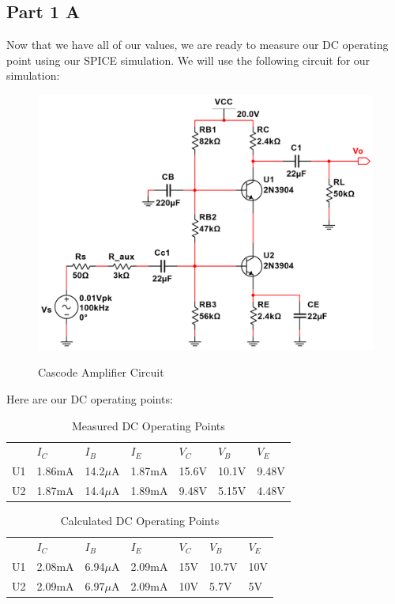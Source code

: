 \documentclass[12pt]{article}
\begin{document}

\subsection{Part 1 A}

Now that we have all of our values, we are  ready to measure our DC operating point using our SPICE simulation. We will use the following circuit for our simulation:

\begin{figure}[h!]
\centering
\includegraphics[height=0.30\textwidth]{Images/part_1_circuit_sim.png}\\
\caption{Cascode Amplifier Circuit}
\label{fig:part1_circuit_sim}
\end{figure}

 Here are our DC operating points:

\begin{table}[h!]
\centering
\begin{tabular}{l|llllll}
   & $I_{C}$ & $I_{B}$    & $I_{E}$ & $V_C$ & $V_B$ & $V_{E}$ \\ \cline{1-7}
U1 & 1.86mA  & 14.2$\mu$A & 1.87mA  & 15.6V  & 10.1V   & 9.48V    \\
U2 & 1.87mA  & 14.4$\mu$A & 1.89mA  & 9.48V  & 5.15V   & 4.48V   
\end{tabular}
\caption{Measured DC Operating Points}
\label{DC_op_point}
\end{table}
\FloatBarrier
\begin{table}[h!]
\centering
\begin{tabular}{l|llllll}
   & $I_{C}$ & $I_{B}$    & $I_{E}$ & $V_C$ & $V_B$ & $V_{E}$ \\ \cline{1-7}
U1 & 2.08mA  & 6.94$\mu$A & 2.09mA  & 15V  & 10.7V   & 10V    \\
U2 & 2.09mA  & 6.97$\mu$A & 2.09mA  & 10V  & 5.7V   & 5V   
\end{tabular}
\caption{Calculated DC Operating Points}
\label{DC_op_point}
\end{table}
\FloatBarrier
\end{document}
